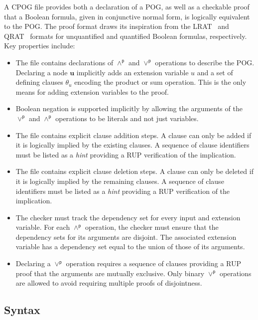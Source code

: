 \documentclass[twoside,11pt]{article}
\newcommand{\pand}{\mathbin{\land^\textsf{p}}}
\newcommand{\por}{\mathbin{\lor^\textsf{p}}}
\newcommand{\makenode}[1]{\mathbf{#1}}
\newcommand{\nodeu}{\makenode{u}}
\begin{document}
A CPOG file provides both a declaration of a POG, as well as a checkable
proof that a Boolean formula, given in conjunctive normal
form, is logically equivalent to the POG\@.
The proof format draws its inspiration from the LRAT~\cite{lrat} and
QRAT~\cite{heule:JAR2014} formats for unquantified and quantified Boolean formulas, respectively.
Key properties include:
\begin{itemize}
  \item
  The file contains declarations of $\pand$ and $\por$ operations to describe the POG.
  Declaring a node $\nodeu$ implicitly adds an extension variable $u$ and a set of defining clauses $\theta_{u}$
  encoding the product or sum operation.
  This is the only means for adding extension variables to the proof.
\item Boolean negation is supported implicitly by allowing the
  arguments of the $\por$ and $\pand$ operations to be literals and not just
  variables.
\item
  The file contains explicit clause addition steps.
  A clause can only be added if it is logically implied by the existing clauses.
  A sequence of clause identifiers must be listed as a \emph{hint} providing a RUP verification of the implication.
\item
  The file contains explicit clause deletion steps.
  A clause can only be deleted if it is logically implied by the remaining clauses.
  A sequence of clause identifiers must be listed as a \emph{hint} providing a RUP verification of the implication.
\item The checker must track the dependency set for every input and
  extension variable.  For each $\pand$ operation, the checker must ensure that the dependency sets for its arguments are disjoint.
  The associated extension variable has a dependency set equal to the union of those of its arguments.
\item Declaring a $\por$ operation requires a sequence of clauses
  providing a RUP proof that the arguments are mutually exclusive.
  Only binary $\por$ operations are allowed to avoid requiring multiple proofs of disjointness.
\end{itemize}

\subsection{Syntax}
\label{subsection:syntax}
\end{document}
